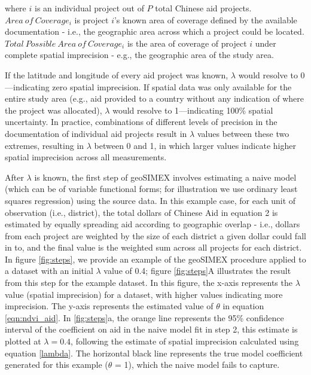 \noindent where $i$ is an individual project out of $P$ total Chinese aid projects. 
$Area \ of \ Coverage_i$ is project $i$'s known area of coverage defined by the available documentation - i.e., the geographic area across which a project could be located. 
$Total \ Possible \ Area \ of \ Coverage_i$ is the area of coverage of project $i$ under complete spatial imprecision - e.g., the geographic area of the study area.
\par
If the latitude and longitude of every aid project was known, $\lambda$ would resolve to 0---indicating zero spatial imprecision. 
If spatial data was only available for the entire study area (e.g., aid provided to a country without any indication of where the project was allocated), $\lambda$ would resolve to 1---indicating 100\% spatial uncertainty. 
In practice, combinations of different levels of precision in the documentation of individual aid projects result in $\lambda$ values between these two extremes, resulting in $\lambda$ between 0 and 1, in which larger values indicate higher spatial imprecision across all measurements.
\par
After $\lambda$ is known, the first step of geoSIMEX involves estimating a naive model (which can be of variable functional forms; for illustration we use ordinary least squares regression) using the source data.
In this example case, for each unit of observation (i.e., district), the total dollars of Chinese Aid in equation 2 is estimated by equally spreading aid according to geographic overlap - i.e., dollars from each project are weighted by the size of each district a given dollar could fall in to, and the final value is the weighted sum across all projects for each district.
In figure \ref{fig:steps}, we provide an example of the geoSIMEX procedure applied to a dataset with an initial $\lambda$ value of 0.4; figure \ref{fig:steps}A illustrates the result from this step for the example dataset.
In this figure, the x-axis represents the $\lambda$ value (spatial imprecision) for a dataset, with higher values indicating more imprecision.
The y-axis represents the estimated value of $\theta$ in equation \ref{eqn:ndvi_aid}.
In \ref{fig:steps}a, the orange line represents the 95\% confidence interval of the coefficient on aid in the naive model fit in step 2, this estimate is plotted at $\lambda = 0.4$, following the estimate of spatial imprecision calculated using equation \ref{lambda}. 
The horizontal black line represents the true model coefficient generated for this example ($\theta$ = 1), which the naive model fails to capture.
